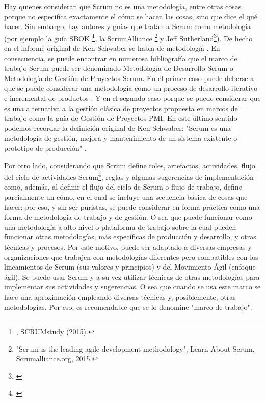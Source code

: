 Hay quienes consideran que Scrum no es una metodología, entre otras cosas porque no especifica exactamente el cómo se hacen las cosas, 
sino que dice el qué hacer. Sin embargo, hay autores y guías que tratan a Scrum como metodología (por ejemplo la guía SBOK \footnote{\cite{SBOK-2013}, SCRUMstudy (2015).}, la ScrumAlliance \footnote{"Scrum is the leading agile development methodology", Learn About Scrum, Scrumalliance.org, 2015.} y Jeff Sutherland\footnote{\cite{Jeff-Sutherland-2016}}). De hecho en el informe original de Ken Schwaber se habla de metodología \cite{Ken-Schwaber-1995}. En consecuencia, se puede encontrar en numerosa bibliografía que el marco de trabajo Scrum puede ser denominado Metodología de Desarrollo Scrum o Metodología de Gestión de Proyectos Scrum. 
En el primer caso puede deberse a que se puede considerar una metodología como un proceso de desarrollo iterativo e incremental de productos \cite{Ken-Schwaber-1995}. Y en el segundo caso porque se puede considerar que es una alternativa a la gestión clásica de proyectos propuesta en marcos de trabajo como la guía de Gestión de Proyectos PMI. En este último sentido podemos recordar la definición original de Ken Schwaber: "Scrum es una metodología de gestión, mejora y mantenimiento de un sistema existente o prototipo de producción" \cite{Ken-Schwaber-1995}.
 
Por otro lado, considerando que Scrum define roles, artefactos, actividades, flujo del ciclo de actividades Scrum\footnote{\cite{Agile-Atlas-2012}}, reglas y algunas sugerencias de implementación como, además, al definir el flujo del ciclo de Scrum o flujo de trabajo, define parcialmente un cómo, en el cual se incluye una secuencia básica de cosas que hacer; por eso, y sin ser puristas, se puede considerar en forma práctica como una forma de metodología de trabajo y de gestión. O sea que puede funcionar como una metodología a alto nivel o plataforma de trabajo sobre la cual pueden funcionar otras metodologías, más específicas de producción y desarrollo, y otras técnicas y procesos. Por este motivo, puede ser adaptado a diversas empresas y organizaciones que trabajen con metodologías diferentes pero compatibles con los lineamientos de Scrum (sus valores y principios) y del Movimiento Ágil (enfoque ágil). Se puede usar Scrum y a su vez utilizar técnicas de otras metodologías para implementar sus actividades y sugerencias. O sea que cuando se usa este marco se hace una aproximación empleando diversas técnicas y, posiblemente, otras metodologías. Por eso, es recomendable que se lo denomine "marco de trabajo".

